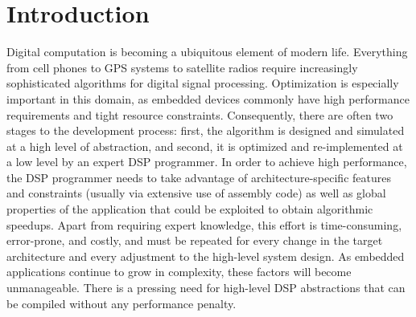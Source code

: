  

\section{Introduction}
Digital computation is becoming a ubiquitous element of modern life.
Everything from cell phones to GPS systems to satellite radios require
increasingly sophisticated algorithms for digital signal processing.
Optimization is especially important in this domain, as embedded
devices commonly have high performance requirements and tight resource
constraints.  Consequently, there are often two stages to the
development process: first, the algorithm is designed and simulated at
a high level of abstraction, and second, it is optimized and
re-implemented at a low level by an expert DSP programmer.  In order
to achieve high performance, the DSP programmer needs to take
advantage of architecture-specific features and constraints (usually
via extensive use of assembly code) as well as global properties of
the application that could be exploited to obtain algorithmic
speedups.  Apart from requiring expert knowledge, this effort is
time-consuming, error-prone, and costly, and must be repeated for
every change in the target architecture and every adjustment to the
high-level system design.  As embedded applications continue to grow
in complexity, these factors will become unmanageable.  There is a
pressing need for high-level DSP abstractions that can be compiled
without any performance penalty.

